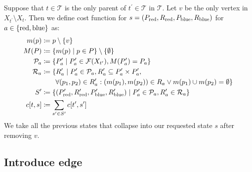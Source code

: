 Suppose that \( t \in \mathcal{T} \) is
the only parent of \( t^\prime \in \mathcal{T} \) in \( \mathcal {T} \).
Let \( v \) be the only vertex in \( X_{t^\prime} \setminus X_t \).
Then we define cost function for \( s=(P_{\text{red}}, R_{\text{red}}, P_{\text{blue}}, R_{\text{blue}}) \)
for \( a \in \{\text{red}, \text{blue}\} \) as:
%
\begin{align}
	m(p)          & \coloneqq p \setminus \{v\}   \notag                                                                                                                    \\
	M(P)          & \coloneqq \{m(p) \mid p \in P \} \setminus \{\emptyset\}   \notag                                                                                       \\
	\mathcal{P}_a & \coloneqq \{ P_a^\prime \mid P_a^\prime \in \mathcal{F}(X_{t^\prime}), M(P_a^\prime) = P_a \}   \notag                                                  \\
	\mathcal{R}_a & \coloneqq \{ R_a^\prime \mid P_a^\prime \in \mathcal{P}_a, R_a^\prime \subseteq P_a^\prime \times P_a^\prime,   \notag                                  \\
	              & \qquad \forall (p_1, p_2) \in R_a^\prime : (m(p_1), m(p_2)) \in R_a \lor m(p_1) \cup m(p_2) = \emptyset \}   \notag                                     \\
	S^\prime      & \coloneqq \{(P_{\text{red}}^\prime, R_{\text{red}}^\prime, P_{\text{blue}}^\prime, R_{\text{blue}}^\prime) \mid P_a^\prime \in \mathcal{P}_a, R_a^\prime \in \mathcal{R}_a  \}   \notag \\
	c[t, s]       & \coloneqq \sum_{s^\prime \in S^\prime} c[t^\prime, s^\prime]
\end{align}
%
We take all the previous states that collapse into our requested state \( s \)
after removing \( v \).

\subsection{Introduce edge}

